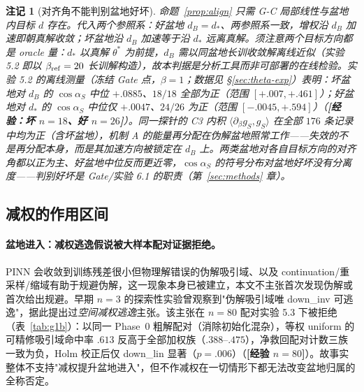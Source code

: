 \documentclass[fontset=windows,11pt]{ctexart}
\newtheorem*{remark}{注记}
\numberwithin{equation}{section}
\begin{document}
\begin{remark}[对齐角不能判别盆地好坏]\label{rem:align-emp}
命题~\ref{prop:align} 只需 G-C 局部线性与盆地内目标 $d$ 存在。代入两个参照系：好盆地 $d_B=d_*$、两参照系一致，增权沿 $d_B$ 加速即朝真解收敛；坏盆地沿 $d_B$ 加速等于沿 $d_*$ \emph{远离真解}。须注意两个目标方向都是 \emph{oracle 量}：$d_*$ 以真解 $\theta^*$ 为前提，$d_B$ 需以同盆地长训收敛解离线近似（实验 5.2 即以 $\beta_{\rm ref}=20$ 长训解构造），故本判据是分析工具而非可部署的在线检验。实验 5.2 的离线测量（冻结 Gate 点，$\beta=1$；数据见 \S\ref{sec:theta-exp}）表明：坏盆地对 $d_B$ 的 $\cos\alpha_S$ 中位 $+.0885$、$18/18$ 全部为正（范围 $[+.007,+.461]$）；好盆地对 $d_*$ 的 $\cos\alpha_S$ 中位仅 $+.0047$、$24/26$ 为正（范围 $[-.0045,+.594]$）（\textbf{[经验：坏 $n=18$、好 $n=26$]}）。同一探针的 C3 内积 $\langle\partial_\beta g_S,g_S\rangle$ 在全部 $176$ 条记录中均为正（含坏盆地），机制 A 的能量再分配在伪解盆地照常工作——失效的不是再分配本身，而是其加速方向被锁定在 $d_B$ 上。两类盆地对各自目标方向的对齐角都以正为主、好盆地中位反而更近零，$\cos\alpha_S$ 的符号分布对盆地好坏没有分离度——判别好坏是 Gate/实验 6.1 的职责（第~\ref{sec:methods} 章）。
\end{remark}

\subsection{减权的作用区间}\label{sec:theta-down}

\paragraph{盆地进入：减权逃逸假说被大样本配对证据拒绝。}
PINN 会收敛到训练残差很小但物理解错误的伪解吸引域、以及 continuation/重采样/缩域有助于规避伪解，这一现象本身已被建立\cite{Rohrhofer2022,WangPseudo2026}，本文不主张首次发现伪解或首次给出规避。早期 $n=3$ 的探索性实验曾观察到"伪解吸引域唯 down\_inv 可逃逸"，据此提出过\emph{空间减权逃逸}主张。该主张在 $n=80$ 配对实验 5.3 下被拒绝（表~\ref{tab:g1b}）：以同一 Phase~0 粗解配对（消除初始化混杂），等权 uniform 的可精修吸引域命中率 $.613$ 反高于全部加权族（$.388$--$.475$），净救回配对计数三族一致为负，Holm 校正后仅 down\_lin 显著（$p=.006$）（\textbf{[经验 $n=80$]}）。故事实整体不支持"减权提升盆地进入"，但不作减权在一切情形下都无法改变盆地归属的全称否定。
\end{document}
